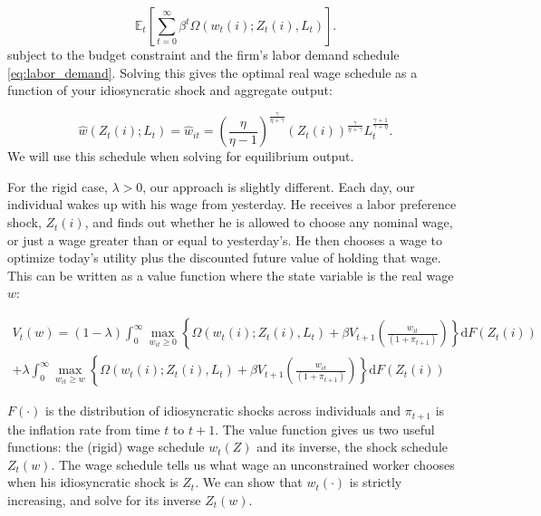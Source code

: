 \documentclass[12pt,a4paper]{scrartcl}            %
\begin{document}
\begin{equation}
    \label{eq:labor_opt}
    \mathbb{E}_t\left[\sum_{t=0}^{\infty}\beta^t \Omega( w_t(i); Z_t(i), L_t ) \right].
\end{equation}
%
subject to the budget constraint and the firm's labor demand schedule \eqref{eq:labor_demand}.
Solving this gives the optimal real wage schedule as a function of your idiosyncratic shock and aggregate output:

\begin{equation}
    \label{eq:flex}
    \hat{w}(Z_t(i); L_t) = \hat{w}_{it} = \left( \frac{\eta}{\eta - 1} \right)^{\frac{\gamma}{\eta + \gamma}}\left( Z_t(i) \right)^{\frac{\gamma}{\eta + \gamma}} L_t^{\frac{\gamma + 1}{\gamma + \eta}}.
\end{equation}
%
We will use this schedule when solving for equilibrium output.

For the rigid case, $\lambda > 0$, our approach is slightly different.
Each day, our individual wakes up with his wage from yesterday.
He receives a labor preference shock, $Z_t(i)$, and finds out whether he is allowed to choose any nominal wage, or just a wage greater than or equal to yesterday's.
He then chooses a wage to optimize today's utility plus the discounted future value of holding that wage.
This can be written as a value function where the state variable is the real wage $w$:

\begin{multline}
    \label{eq:value_function}
    V_t(w) = (1 - \lambda) \int_{0}^{\infty} \max_{w_{it} \geq 0} \left\{ \Omega( w_t(i); Z_t(i), L_t ) + \beta V_{t+1}\left( \frac{w_{it}}{(1 + \pi_{t+1})} \right) \right\} \mathrm{d}F(Z_t(i)) \\
                + \lambda  \int_{0}^{\infty} \max_{w_{it} \geq w} \left\{ \Omega( w_t(i); Z_t(i), L_t ) + \beta V_{t+1}\left( \frac{w_{it}}{(1 + \pi_{t+1})} \right) \right\} \mathrm{d}F(Z_t(i))
\end{multline}

$F(\cdot)$ is the distribution of idiosyncratic shocks across individuals and $\pi_{t+1}$ is the inflation rate from time $t$ to $t+1$.
The value function gives us two useful functions: the (rigid) wage schedule $w_t(Z)$ and its inverse, the shock schedule $Z_t(w)$.
The wage schedule tells us what wage an unconstrained worker chooses when his idiosyncratic shock is $Z_t$.
We can show that $w_t(\cdot)$ is strictly increasing, and solve for its inverse $Z_t(w)$.
\end{document}
